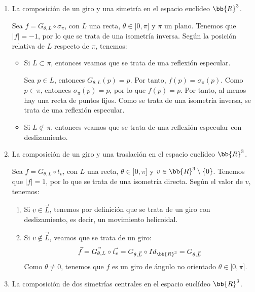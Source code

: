 \begin{ejercicio}
\begin{enumerate}
        \item La composición de un giro y una simetría en el espacio euclídeo $\bb{R}^3$.
        
        Sea $f = G_{\theta, L} \circ \sigma_{\pi}$, con $L$ una recta, $\theta \in ]0, \pi]$ y $\pi$ un plano.
        Tenemos que $|f| = -1$, por lo que se trata de una isometría inversa. Según la posición relativa de $L$ respecto de $\pi$, tenemos:
        \begin{itemize}
            \item Si $L\subset \pi$, entonces veamos que se trata de una reflexión especular.
            
            Sea $p\in L$, entonces $G_{\theta, L}(p)=p$. Por tanto, $f(p)=\sigma_{\pi}(p)$. Como $p\in \pi$, entonces $\sigma_{\pi}(p)=p$, por lo que $f(p)=p$.
            Por tanto, al menos hay una recta de puntos fijos. Como se trata de una isometría inversa, se trata de una reflexión especular.
            
            \item Si $L\not\subset \pi$, entonces veamos que se trata de una reflexión especular con deslizamiento.
        \end{itemize}

        \item La composición de un giro y una traslación en el espacio euclídeo $\bb{R}^3$.
        
        Sea $f = G_{\theta, L} \circ t_v$, con $L$ una recta, $\theta \in ]0, \pi]$ y $v\in \bb{R}^3\setminus \{0\}$.
        Tenemos que $|f| = 1$, por lo que se trata de una isometría directa. Según el valor de $v$, tenemos:
        \begin{enumerate}
            \item Si $v\in \vec{L}$, tenemos por definición que se trata de un giro con deslizamiento, es decir, un movimiento helicoidal.
            \item Si $v\notin \vec{L}$, veamos que se trata de un giro:
            \begin{equation*}
                \vec{f} = \vec{G_{\theta, L}} \circ \vec{t_v} = G_{\theta, \vec{L}} \circ Id_{\bb{R}^3} = G_{\theta, \vec{L}}
            \end{equation*}
            Como $\theta \neq 0$, tenemos que $f$ es un giro de ángulo no orientado $\theta \in ]0, \pi]$.
        \end{enumerate}


        \item La composición de dos simetrías centrales en el espacio euclídeo $\bb{R}^3$.
        

\end{enumerate}
\end{ejercicio}
